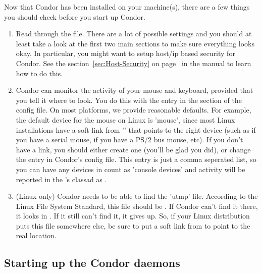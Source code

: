 Now that Condor has been installed on your machine(s), there are a few
things you should check before you start up Condor.

\begin{enumerate}
\item Read through the  file.  There are a
    lot of possible settings and you should at least take a look at
    the first two main sections to make sure everything looks okay.
    In particular, you might want to setup host/ip based security for
    Condor.  See the section~\ref{sec:Host-Security} on
    page~\pageref{sec:Host-Security} in the manual to learn how to do
    this.

\item Condor can monitor the activity of your mouse and keyboard,
    provided that you tell it where to look.  You do this with the
     entry in the  section of
    the config file.  On most platforms, we provide reasonable
    defaults.  For example, the default device for the mouse on Linux
    is 'mouse', since most Linux installations have a soft link from
    '' that points to the right device (such as
     if you have a serial mouse,  if you have
    a PS/2 bus mouse, etc).  If you don't have a 
    link, you should either create one (you'll be glad you did), or
    change the  entry in Condor's config file.
    This entry is just a comma seperated list, so you can have any
    devices in  count as 'console devices' and activity
    will be reported in the 's classad as
    .

\item  (Linux only) Condor needs to be able to find the 'utmp' file.
    According to the Linux File System Standard, this file should be
    .  If Condor can't find it there, it looks in
    .  If it still can't find it, it gives up.  So, if
    your Linux distribution puts this file somewhere else, be sure to
    put a soft link from  to point to the real location.

\end{enumerate}

\subsection{Starting up the Condor daemons}

